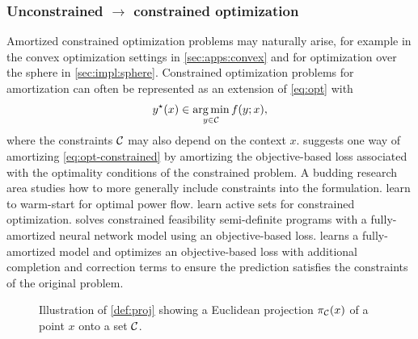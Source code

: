 \subsubsection{Unconstrained $\rightarrow$ constrained optimization}
\label{sec:constraints}
Amortized constrained optimization problems may naturally arise, for example
in the convex optimization settings in \cref{sec:apps:convex}
and for optimization over the sphere in \cref{sec:impl:sphere}.
Constrained optimization problems for amortization can often be represented as
an extension of \cref{eq:opt} with
\begin{equation}
  y^\star(x) \in \operatorname*{arg\,min}_{y\in{\mathcal{C}}} f(y; x),
  \label{eq:opt-constrained}
\end{equation}
where the constraints ${\mathcal{C}}$ may also depend on the context $x$.
 suggests one way of amortizing
\cref{eq:opt-constrained} by amortizing the objective-based loss
associated with the optimality conditions of the constrained problem.
A budding research area studies how to more generally include
constraints into the formulation.
\citet{baker2019learning,dong2020smart,zamzam2020learning,pan2020deepopf}
learn to warm-start for optimal power flow.
\citet{misra2021learning} learn active sets for constrained optimization.
\citet{krivachy2020fast} solves constrained feasibility semi-definite programs
with a fully-amortized neural network model using an
objective-based loss.
\citet{donti2021dc3} learns a fully-amortized model and optimizes an
objective-based loss with additional completion and correction terms
to ensure the prediction satisfies the constraints of the original problem.


\begin{figure}[t]
  \centering
  \label{fig:projection}
  \caption{Illustration of \cref{def:proj} showing
    a Euclidean projection $\pi_{\mathcal{C}}(x)$ of a point $x$
    onto a set ${\mathcal{C}}$.}
\end{figure}


